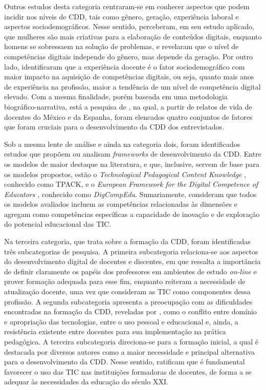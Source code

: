 \documentclass[portuguese]{textolivre}
\begin{document}
Outros estudos desta categoria centraram-se em conhecer aspectos que podem incidir nos níveis de CDD, tais como gênero, geração, experiência laboral e aspectos sociodemográficos. Nesse sentido, \textcite{sanchez_alisis_2020} perceberam, em seu estudo aplicado, que mulheres são mais criativas para a elaboração de conteúdos digitais, enquanto homens se sobressaem na solução de problemas, e \textcite{andrade_digital_2020} revelaram que o nível de competências digitais independe do gênero, mas depende da geração. Por outro lado, \textcite{lucena_factors_2019} identificaram que a experiência docente é o fator sociodemográfico com maior impacto na aquisição de competências digitais, ou seja, quanto mais anos de experiência na profissão, maior a tendência de um nível de competência digital elevado. Com a mesma finalidade, porém baseada em uma metodologia biográfico-narrativa, está a pesquisa de \textcite{hernandez_evolucion_2020}, na qual, a partir de relatos de vida de docentes do México e da Espanha, foram elencados quatro conjuntos de fatores que foram cruciais para o desenvolvimento da CDD dos entrevistados.

Sob a mesma lente de análise e ainda na categoria dois, foram identificados estudos que propõem ou analisam \textit{frameworks} de desenvolvimento da CDD. Entre os modelos de maior destaque na literatura, e que, inclusive, servem de base para os modelos propostos, estão o \textit{Technological Pedagogical Content Knowledge} \cite{mishra_technological_2006}, conhecido como TPACK, e o \textit{European Framework for the Digital Competence of Educators} \cite{redecker_european_2017}, conhecido como \textit{DigCompEdu}. Sumariamente, \textcite{cuartero_alisis_2016} consideram que todos os modelos avaliados incluem as competências relacionadas às dimensões e agregam como competências específicas a capacidade de inovação e de exploração do potencial educacional das TIC.

Na terceira categoria, que trata sobre a formação da CDD, foram identificadas três subcategorias de pesquisa. A primeira subcategoria relaciona-se aos aspectos do desenvolvimento digital de docentes e discentes, em que \textcite{rosenblit_e-teaching_2018} ressalta a importância de definir claramente os papéis dos professores em ambientes de estudo \textit{on-line} e prover formação adequada para esse fim, enquanto \textcite{hepp_teacher_2015} reiteram a necessidade de atualização docente, uma vez que consideram as TIC como componentes dessa profissão. A segunda subcategoria apresenta a preocupação com as dificuldades encontradas na formação da CDD, reveladas por \textcite{instefjord_appropriation_2015}, como o conflito entre domínio e apropriação das tecnologias, entre o uso pessoal e educacional e, ainda, a resistência existente entre docentes para sua implementação na prática pedagógica. A terceira subcategoria direciona-se para a formação inicial, a qual é destacada por diversos autores como a maior necessidade e principal alternativa para o desenvolvimento da CDD. Nesse sentido, \textcite{trigueros_digital_2019} ratificam que é fundamental favorecer o uso das TIC nas instituições formadoras de docentes, de forma a se adequar às necessidades da educação do século XXI.
\end{document}
